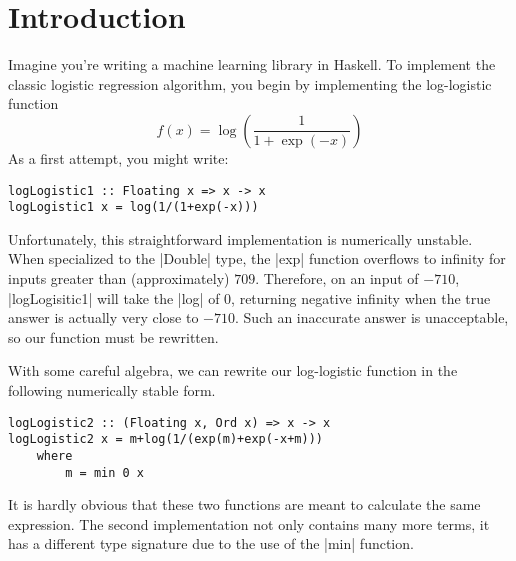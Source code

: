 \documentclass[preprint]{sigplanconf}
\theoremstyle{definition}
\begin{document}



\section{Introduction}

Imagine you're writing a machine learning library in Haskell.
To implement the classic logistic regression algorithm,
you begin by implementing the log-logistic function
\begin{equation}
f(x) = \log\left(\frac{1}{1+\exp{(-x)}}\right)
\label{eq:log-logistic}
\end{equation}
As a first attempt, you might write:
\begin{lstlisting}
logLogistic1 :: Floating x => x -> x
logLogistic1 x = log(1/(1+exp(-x)))
\end{lstlisting}
Unfortunately, this straightforward implementation is numerically unstable.
When specialized to the |Double| type,
the |exp| function overflows to infinity for inputs greater than (approximately) $709$.
Therefore, on an input of $-710$,
|logLogisitic1| will take the |log| of 0,
returning negative infinity when the true answer is actually very close to $-710$.
Such an inaccurate answer is unacceptable,
so our function must be rewritten.

With some careful algebra, we can rewrite our log-logistic function in the following numerically stable form.
\begin{lstlisting}
logLogistic2 :: (Floating x, Ord x) => x -> x
logLogistic2 x = m+log(1/(exp(m)+exp(-x+m)))
    where
        m = min 0 x
\end{lstlisting}
It is hardly obvious that these two functions are meant to calculate the same expression.
The second implementation not only contains many more terms,
it has a different type signature due to the use of the |min| function.
\end{document}
